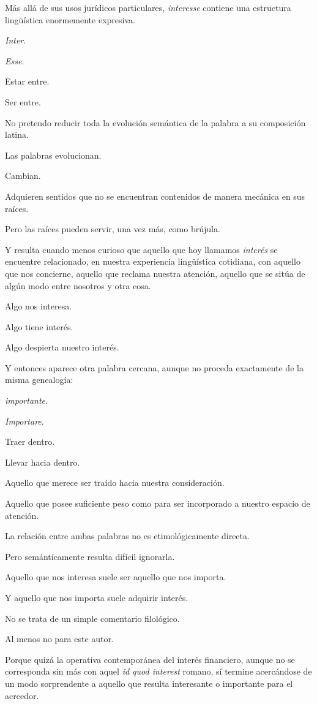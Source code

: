\documentclass[12pt,a4paper]{article}
\begin{document}
Más allá de sus usos jurídicos particulares, \emph{interesse} contiene una estructura lingüística enormemente expresiva.

\emph{Inter}.

\emph{Esse}.

Estar entre.

Ser entre.

No pretendo reducir toda la evolución semántica de la palabra a su composición latina.

Las palabras evolucionan.

Cambian.

Adquieren sentidos que no se encuentran contenidos de manera mecánica en sus raíces.

Pero las raíces pueden servir, una vez más, como brújula.

Y resulta cuando menos curioso que aquello que hoy llamamos \emph{interés} se encuentre relacionado, en nuestra experiencia lingüística cotidiana, con aquello que nos concierne, aquello que reclama nuestra atención, aquello que se sitúa de algún modo entre nosotros y otra cosa.

Algo nos interesa.

Algo tiene interés.

Algo despierta nuestro interés.

Y entonces aparece otra palabra cercana, aunque no proceda exactamente de la misma genealogía:

\emph{importante}.

\emph{Importare}.

Traer dentro.

Llevar hacia dentro.

Aquello que merece ser traído hacia nuestra consideración.

Aquello que posee suficiente peso como para ser incorporado a nuestro espacio de atención.

La relación entre ambas palabras no es etimológicamente directa.

Pero semánticamente resulta difícil ignorarla.

Aquello que nos interesa suele ser aquello que nos importa.

Y aquello que nos importa suele adquirir interés.

No se trata de un simple comentario filológico.

Al menos no para este autor.

Porque quizá la operativa contemporánea del interés financiero, aunque no se corresponda sin más con aquel \emph{id quod interest} romano, sí termine acercándose de un modo sorprendente a aquello que resulta interesante o importante para el acreedor.
\end{document}
